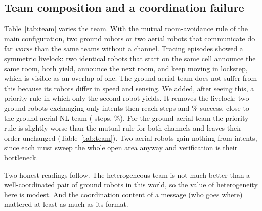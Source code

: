 \begin{table}[t]\centering
\caption{Team composition and coordination rule on the mixed task (5 seeds of 80 episodes). ``Priority rule'': only the second robot avoids the room its teammate announced.}\label{tab:team}
\resizebox{\columnwidth}{!}{}
\end{table}

\subsection{Team composition and a coordination failure}
Table~\ref{tab:team} varies the team. With the mutual room-avoidance rule of the main configuration, two ground robots or two aerial robots that communicate do far \emph{worse} than the same teams without a channel. Tracing episodes showed a symmetric livelock: two identical robots that start on the same cell announce the same room, both yield, announce the next room, and keep moving in lockstep, which is visible as an overlap of one. The ground-aerial team does not suffer from this because its robots differ in speed and sensing. We added, after seeing this, a priority rule in which only the second robot yields. It removes the livelock: two ground robots exchanging only intents then reach  steps and \% success, close to the ground-aerial NL team ( steps, \%). For the ground-aerial team the priority rule is slightly worse than the mutual rule for both channels and leaves their order unchanged (Table~\ref{tab:team}). Two aerial robots gain nothing from intents, since each must sweep the whole open area anyway and verification is their bottleneck.

Two honest readings follow. The heterogeneous team is not much better than a well-coordinated pair of ground robots in this world, so the value of heterogeneity here is modest. And the coordination content of a message (who goes where) mattered at least as much as its format.
